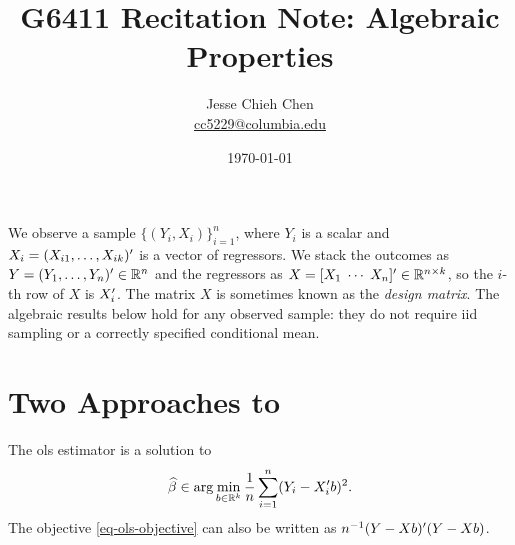 \documentclass[a4paper,12pt]{article}
\title{G6411 Recitation Note: \glsentryshort{ols} Algebraic Properties}
\author{Jesse Chieh Chen\\\href{mailto:cc5229@columbia.edu}{cc5229@columbia.edu}}
\date{\today}
\begin{document}
%
%
%
%
%
%
%
%
%
%

\maketitle

\noindent
We observe a sample $\{(Y_i,X_i)\}_{i=1}^n$,
where $Y_i$ is a scalar and $X_i=(X_{i1},\ldots,X_{ik})^{\prime}$ is a vector of regressors.
We stack the outcomes as $Y=(Y_1,\ldots,Y_n)^{\prime}\in\mathbb{R}^n$
and the regressors as $X=[X_1\;\cdots\;X_n]^{\prime}\in\mathbb{R}^{n\times k}$,
so the $i$-th row of $X$ is $X_i^{\prime}$.
The matrix $X$ is sometimes known as the \emph{design matrix}.
The algebraic results below hold for any observed sample:
they do not require \gls{iid} sampling or a correctly specified conditional mean.

\section{Two Approaches to }

\begin{definition}\label{def-ols}
	The \gls{ols} estimator is a solution to
	\begin{align}\label{eq-ols-objective}
		\widehat\beta\in\arg\min_{b\in\mathbb{R}^k}\frac{1}{n}\sum_{i=1}^n(Y_i-X_i^{\prime} b)^2.
	\end{align}
	The objective \eqref{eq-ols-objective} can also be written as $n^{-1}(Y-X b)^{\prime}(Y-X b)$.
\end{definition}
\end{document}
